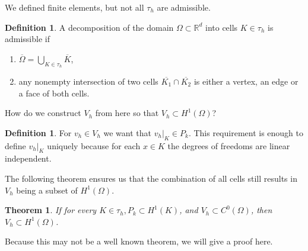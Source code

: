 \documentclass[12pt,a4paper,twoside, open=right]{scrreprt}
\theoremstyle{definition}
\newtheorem{defn}[auf]{Definition}
\theoremstyle{plain}
\newtheorem{sa}[auf]{Theorem}
\newcommand{\rr}{\mathbb{R}}
\begin{document}
    We defined finite elements, but not all $\tau_h$ are admissible.
\begin{defn}
    A decomposition of the domain $\Omega\subset\rr^d$ into cells $K\in\tau_h$ is admissible if
    \begin{enumerate}
        \item $\overline{\Omega}=\bigcup_{K\in\tau_h}\overline{K}$,
        \item any nonempty intersection of two cells $\overline{K_1}\cap\overline{K_2}$ is either a vertex, an edge or a face of both cells.
    \end{enumerate}
\end{defn}
How do we construct $V_h$ from here so that $V_h\subset H^1(\Omega)$?
\begin{defn}
    For $v_h\in V_h$ we want that $v_h\vert_K\in P_k$. This requirement is enough to define $v_h\vert_K$ uniquely because for each $x\in K$ the degrees of freedoms are linear independent.
\end{defn}
The following theorem ensures us that the combination of all cells still results in $V_h$ being a subset of $H^1(\Omega)$.
\begin{sa}
    If for every $K\in\tau_h,P_k\subset H^1(K)$, and $V_h\subset C^0(\Omega)$, then $V_h\subset H^1(\Omega)$.
\end{sa}
Because this may not be a well known theorem, we will give a proof here.
\end{document}
